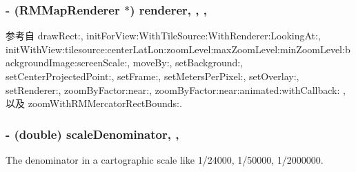 \hypertarget{interface_r_m_map_contents_a5054d0d02002aa0757df91c9567d0cd9}{
\subsubsection[{renderer}]{\setlength{\rightskip}{0pt plus 5cm}-\/ ({\bf R\-M\-Map\-Renderer} $\ast$) renderer\hspace{0.3cm}{\ttfamily [read]}, {\ttfamily [write]}, {\ttfamily [atomic]}, {\ttfamily [retain]}}}\label{interface_r_m_map_contents_a5054d0d02002aa0757df91c9567d0cd9}


参考自 draw\-Rect\-:, init\-For\-View\-:\-With\-Tile\-Source\-:\-With\-Renderer\-:\-Looking\-At\-:, init\-With\-View\-:tilesource\-:center\-Lat\-Lon\-:zoom\-Level\-:max\-Zoom\-Level\-:min\-Zoom\-Level\-:background\-Image\-:screen\-Scale\-:, move\-By\-:, set\-Background\-:, set\-Center\-Projected\-Point\-:, set\-Frame\-:, set\-Meters\-Per\-Pixel\-:, set\-Overlay\-:, set\-Renderer\-:, zoom\-By\-Factor\-:near\-:, zoom\-By\-Factor\-:near\-:animated\-:with\-Callback\-: , 以及 zoom\-With\-R\-M\-Mercator\-Rect\-Bounds\-:.

\hypertarget{interface_r_m_map_contents_a5f23576d9f94b8528a3886af2013144d}{
\subsubsection[{scale\-Denominator}]{\setlength{\rightskip}{0pt plus 5cm}-\/ (double) scale\-Denominator\hspace{0.3cm}{\ttfamily [read]}, {\ttfamily [atomic]}, {\ttfamily [assign]}}}\label{interface_r_m_map_contents_a5f23576d9f94b8528a3886af2013144d}


The denominator in a cartographic scale like 1/24000, 1/50000, 1/2000000. 

